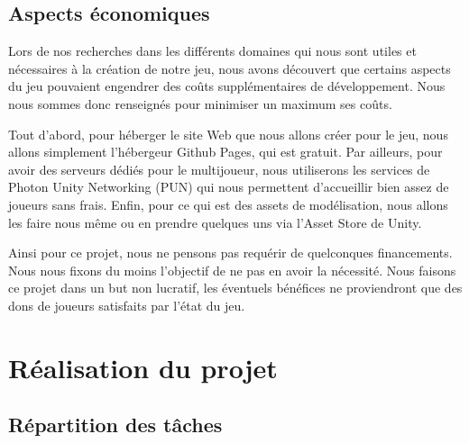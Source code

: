 \documentclass[12pt]{article}
\begin{document}
        \subsection{Aspects économiques}
                Lors de nos recherches dans les différents domaines qui nous sont utiles et nécessaires à la création de notre jeu, nous avons découvert que certains aspects du jeu pouvaient engendrer des coûts supplémentaires de développement. Nous nous sommes donc renseignés pour minimiser un maximum ses coûts.
                \\
                \par Tout d'abord, pour héberger le site Web que nous allons créer pour le jeu, nous allons simplement l'hébergeur Github Pages, qui est gratuit. Par ailleurs, pour avoir des serveurs dédiés pour le multijoueur, nous utiliserons les services de Photon Unity Networking (PUN) qui nous permettent d'accueillir bien assez de joueurs sans frais. Enfin, pour ce qui est des assets de modélisation, nous allons les faire nous même ou en prendre quelques uns via l'Asset Store de Unity.
                \\
                \par Ainsi pour ce projet, nous ne pensons pas requérir de quelconques financements. Nous nous fixons du moins l'objectif de ne pas en avoir la nécessité. Nous faisons ce projet dans un but non lucratif, les éventuels bénéfices ne proviendront que des dons de joueurs satisfaits par l'état du jeu.
        \clearpage
        
        \section{Réalisation du projet}
            \subsection{Répartition des tâches}
            
\end{document}
